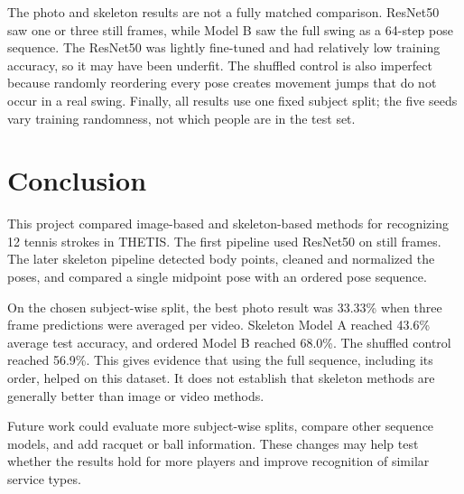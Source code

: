 \documentclass[12pt,a4paper]{article}
\begin{document}
The photo and skeleton results are not a fully matched comparison. ResNet50 saw one or three still frames, while Model B saw the full swing as a 64-step pose sequence. The ResNet50 was lightly fine-tuned and had relatively low training accuracy, so it may have been underfit. The shuffled control is also imperfect because randomly reordering every pose creates movement jumps that do not occur in a real swing. Finally, all results use one fixed subject split; the five seeds vary training randomness, not which people are in the test set.

\clearpage
\section{Conclusion}
This project compared image-based and skeleton-based methods for recognizing 12 tennis strokes in THETIS. The first pipeline used ResNet50 on still frames. The later skeleton pipeline detected body points, cleaned and normalized the poses, and compared a single midpoint pose with an ordered pose sequence.

On the chosen subject-wise split, the best photo result was 33.33\% when three frame predictions were averaged per video. Skeleton Model A reached 43.6\% average test accuracy, and ordered Model B reached 68.0\%. The shuffled control reached 56.9\%. This gives evidence that using the full sequence, including its order, helped on this dataset. It does not establish that skeleton methods are generally better than image or video methods.

Future work could evaluate more subject-wise splits, compare other sequence models, and add racquet or ball information. These changes may help test whether the results hold for more players and improve recognition of similar service types.
\end{document}
